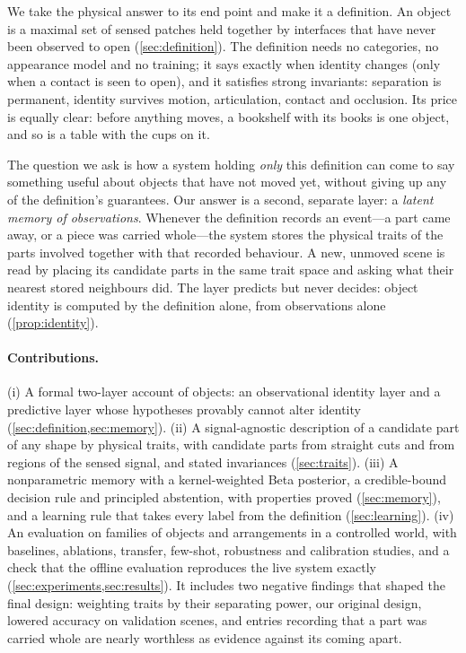 \documentclass[10pt]{article}
\begin{document}
We take the physical answer to its end point and make it a definition. An object is a maximal set of sensed patches held together by interfaces that have never been observed to open (\cref{sec:definition}). The definition needs no categories, no appearance model and no training; it says exactly when identity changes (only when a contact is seen to open), and it satisfies strong invariants: separation is permanent, identity survives motion, articulation, contact and occlusion. Its price is equally clear: before anything moves, a bookshelf with its books is one object, and so is a table with the cups on it.

The question we ask is how a system holding \emph{only} this definition can come to say something useful about objects that have not moved yet, without giving up any of the definition's guarantees. Our answer is a second, separate layer: a \emph{latent memory of observations}. Whenever the definition records an event---a part came away, or a piece was carried whole---the system stores the physical traits of the parts involved together with that recorded behaviour. A new, unmoved scene is read by placing its candidate parts in the same trait space and asking what their nearest stored neighbours did. The layer predicts but never decides: object identity is computed by the definition alone, from observations alone (\cref{prop:identity}).

\paragraph{Contributions.}
(i) A formal two-layer account of objects: an observational identity layer and a predictive layer whose hypotheses provably cannot alter identity (\cref{sec:definition,sec:memory}).
(ii) A signal-agnostic description of a candidate part of any shape by \nTraits{} physical traits, with candidate parts from straight cuts and from regions of the sensed signal, and stated invariances (\cref{sec:traits}).
(iii) A nonparametric memory with a kernel-weighted Beta posterior, a credible-bound decision rule and principled abstention, with properties proved (\cref{sec:memory}), and a learning rule that takes every label from the definition (\cref{sec:learning}).
(iv) An evaluation on \nFamilies{} families of objects and arrangements in a controlled world, with baselines, ablations, transfer, few-shot, robustness and calibration studies, and a check that the offline evaluation reproduces the live system exactly (\cref{sec:experiments,sec:results}). It includes two negative findings that shaped the final design: weighting traits by their separating power, our original design, lowered accuracy on validation scenes, and entries recording that a part was carried whole are nearly worthless as evidence against its coming apart.
\end{document}
